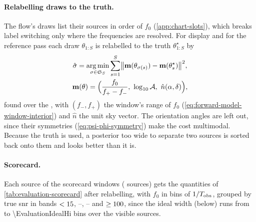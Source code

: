 \paragraph{Relabelling draws to the truth.}
\label{app:evaluation-matching}
The flow's draws list their sources in order of $f_0$ (\cref{app:chart-slots}), which breaks label switching
\citep{stephens2000dealing,jasra2005markov,buscicchio2019label} only where the frequencies are resolved. For display
and for the reference pass each draw $\theta_{1:S}$ is relabelled to the truth $\theta^\star_{1:S}$ by
\begin{gather}
  \hat\sigma = \operatorname*{arg\,min}_{\sigma\in\mathfrak S_S}
  \sum_{s=1}^{S}\bigl\|\mathbf m(\theta_{\sigma(s)}) - \mathbf m(\theta^\star_s)\bigr\|^2,
  \label{eq:evaluation-matching}\\
  \mathbf m(\theta) = \Bigl(\frac{f_0}{f_+ - f_-},\ \log_{10}\mathcal{A},\ \hat n(\alpha,\delta)\Bigr),
  \nonumber
\end{gather}
found over the , with $(f_-, f_+)$ the window's range of $f_0$
(\cref{eq:forward-model-window-interior}) and $\hat n$ the unit sky vector. The orientation angles are left out, since
their symmetries (\cref{eq:psi-phi-symmetry}) make the cost multimodal. Because the truth is used, a posterior too wide
to separate two sources is sorted back onto them and looks better than it is.

\paragraph{Scorecard.}
\label{app:evaluation-scorecard}
Each source of the scorecard windows (\EvaluationWindowSources{} sources) gets the quantities of
\cref{tab:evaluation-scorecard} after relabelling, with $f_0$ in bins of $1/T_{\rm obs}$, grouped by true \ac{snr} in bands
$<15$, \EvaluationBandOne--\EvaluationBandTwo, \EvaluationBandTwo--\EvaluationBandThree{} and
$\ge100$, since the ideal width (below) runs from \EvaluationIdealLo{} to \num{\EvaluationIdealHi}
bins over the visible sources.


